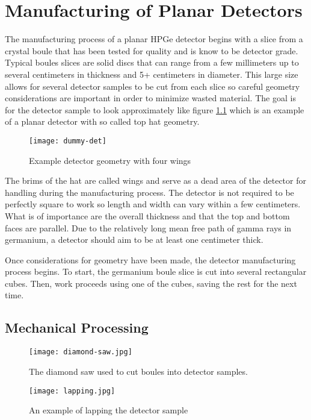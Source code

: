 \chapter{Manufacturing of Planar Detectors}
The manufacturing process of a planar HPGe detector begins with a slice from a crystal boule that has been tested for quality and is know to be detector grade.
Typical boules slices are solid discs that can range from a few millimeters up to several centimeters in thickness and 5+ centimeters in diameter.
This large size allows for several detector samples to be cut from each slice so careful geometry considerations are important in order to minimize wasted material.
The goal is for the detector sample to look approximately like figure \ref{fig:dummydet} which is an example of a planar detector with so called top hat geometry.
\begin{figure}[htpb]
\centering
\texttt{[image: dummy-det]}
\caption{Example detector geometry with four wings}
\label{fig:dummydet}
\end{figure}
The brims of the hat are called wings and serve as a dead area of the detector for handling during the manufacturing process.
The detector is not required to be perfectly square to work so length and width can vary within a few centimeters.
What is of importance are the overall thickness and that the top and bottom faces are parallel.
Due to the relatively long mean free path of gamma rays in germanium, a detector should aim to be at least one centimeter thick.

Once considerations for geometry have been made, the detector manufacturing process begins.
To start, the germanium boule slice is cut into several rectangular cubes.
Then, work proceeds using one of the cubes, saving the rest for the next time.
\section{Mechanical Processing}

\begin{figure}[htpb]
\centering
\texttt{[image: diamond-saw.jpg]}
\caption{The diamond saw used to cut boules into detector samples.}
\label{fig:diamondsaw}
\end{figure}

\begin{figure}[htpb]
\centering
\texttt{[image: lapping.jpg]}
\caption{An example of lapping the detector sample}
\label{fig:lapping}
\end{figure}

